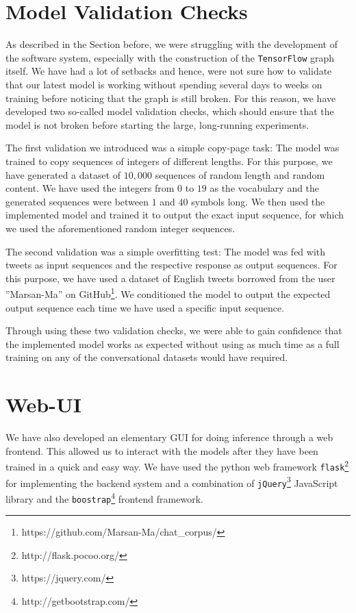 \section{Model Validation Checks}
\label{software_sytem:model_validation_checks}
As described in the Section before, we were struggling with the development of the software system, especially with the construction of the \texttt{TensorFlow} graph itself. We have had a lot of setbacks and hence, were not sure how to validate that our latest model is working without spending several days to weeks on training before noticing that the graph is still broken. For this reason, we have developed two so-called model validation checks, which should ensure that the model is not broken before starting the large, long-running experiments.

The first validation we introduced was a simple copy-page task: The model was trained to copy sequences of integers of different lengths. For this purpose, we have generated a dataset of $10,000$ sequences of random length and random content. We have used the integers from $0$ to $19$ as the vocabulary and the generated sequences were between $1$ and $40$ symbols long. We then used the implemented model and trained it to output the exact input sequence, for which we used the aforementioned random integer sequences. 

The second validation was a simple overfitting test: The model was fed with tweets as input sequences and the respective response as output sequences. For this purpose, we have used a dataset of English tweets borrowed from the user ''Marsan-Ma'' on GitHub\footnote{https://github.com/Marsan-Ma/chat\_corpus/}. We conditioned the model to output the expected output sequence each time we have used a specific input sequence.

Through using these two validation checks, we were able to gain confidence that the implemented model works as expected without using as much time as a full training on any of the conversational datasets would have required.

\section{Web-UI}
We have also developed an elementary GUI for doing inference through a web frontend. This allowed us to interact with the models after they have been trained in a quick and easy way. We have used the python web framework \texttt{flask}\footnote{http://flask.pocoo.org/} for implementing the backend system and a combination of \texttt{jQuery}\footnote{https://jquery.com/} JavaScript library and the \texttt{boostrap}\footnote{http://getbootstrap.com/} frontend framework.

